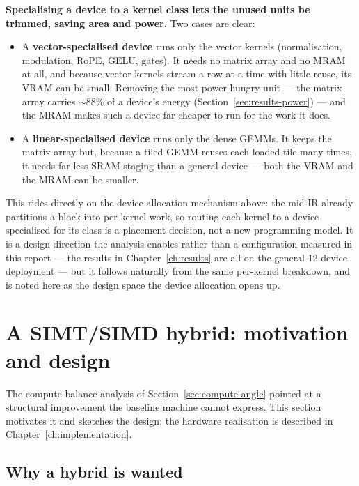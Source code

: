 \documentclass[11pt]{report}
\begin{document}
\textbf{Specialising a device to a kernel class lets the unused units be
trimmed, saving area and power.} Two cases are clear:

\begin{itemize}
\item A \textbf{vector-specialised device} runs only the vector kernels
(normalisation, modulation, RoPE, GELU, gates). It needs no matrix array and
no MRAM at all, and because vector kernels stream a row at a time with little
reuse, its VRAM can be small. Removing the most power-hungry unit --- the
matrix array carries ${\sim}88\%$ of a device's energy
(Section~\ref{sec:results-power}) --- and the MRAM makes such a device far
cheaper to run for the work it does.
\item A \textbf{linear-specialised device} runs only the dense GEMMs. It
keeps the matrix array but, because a tiled GEMM reuses each loaded tile many
times, it needs far less SRAM staging than a general device --- both the VRAM
and the MRAM can be smaller.
\end{itemize}

This rides directly on the device-allocation mechanism above: the mid-IR
already partitions a block into per-kernel work, so routing each kernel to a
device specialised for its class is a placement decision, not a new
programming model. It is a design direction the analysis enables rather than
a configuration measured in this report --- the results in
Chapter~\ref{ch:results} are all on the general 12-device deployment --- but
it follows naturally from the same per-kernel breakdown, and is noted here as
the design space the device allocation opens up.

\section{A SIMT/SIMD hybrid: motivation and design}
\label{sec:simt}

The compute-balance analysis of Section~\ref{sec:compute-angle} pointed at a
structural improvement the baseline machine cannot express. This section
motivates it and sketches the design; the hardware realisation is described
in Chapter~\ref{ch:implementation}.

\subsection{Why a hybrid is wanted}
\end{document}
